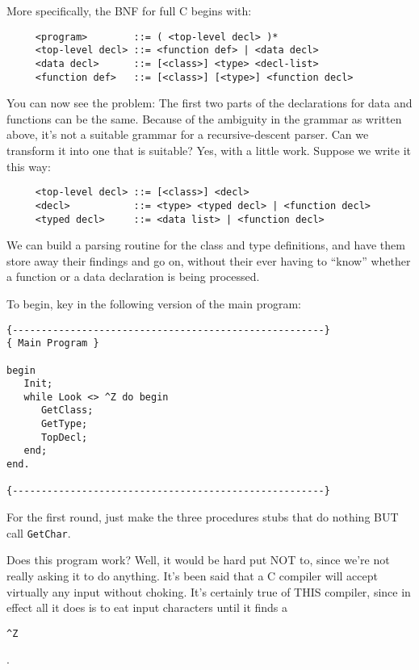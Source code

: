 More specifically, the BNF for full C begins with:

\begin{verbatim}
     <program>        ::= ( <top-level decl> )*
     <top-level decl> ::= <function def> | <data decl>
     <data decl>      ::= [<class>] <type> <decl-list>
     <function def>   ::= [<class>] [<type>] <function decl>
\end{verbatim}

You  can  now  see the problem:   The  first  two  parts  of  the declarations for data and functions can be the same. Because of the  ambiguity  in  the grammar as  written  above, it's  not  a suitable  grammar  for  a  recursive-descent  parser. Can  we transform it into one that is suitable?  Yes, with a little work. Suppose we write it this way:

\begin{verbatim}
     <top-level decl> ::= [<class>] <decl>
     <decl>           ::= <type> <typed decl> | <function decl>
     <typed decl>     ::= <data list> | <function decl>
\end{verbatim}

We  can  build  a  parsing  routine  for  the   class   and  type definitions, and have them store away their findings  and  go on, without their ever having to ``know'' whether a function or  a data declaration is being processed.

To begin, key in the following version of the main program:

\begin{verbatim}
{------------------------------------------------------}
{ Main Program }

begin
   Init;
   while Look <> ^Z do begin
      GetClass;
      GetType;
      TopDecl;
   end;
end.

{------------------------------------------------------}
\end{verbatim}

For the first round, just make the three procedures stubs that do nothing  BUT  call {\tt GetChar}.

Does this program work?  Well, it would be hard put NOT to, since we're not really asking it to do anything. It's been said that a C compiler will accept virtually any input without choking. It's certainly true of THIS  compiler, since in effect all it does is to eat input characters until it finds a \begin{verbatim}^Z\end{verbatim}.

